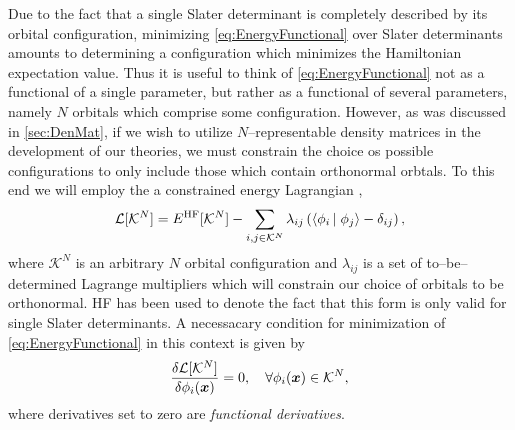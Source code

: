 Due to the fact that a single Slater determinant is completely described by its orbital configuration,
minimizing \cref{eq:EnergyFunctional} over Slater determinants amounts to determining a configuration
which minimizes the Hamiltonian expectation value. Thus it is useful to think of \cref{eq:EnergyFunctional}
not as a functional of a single parameter, but rather as a functional of several parameters, namely $N$
orbitals which comprise some configuration. However, as was discussed in \cref{sec:DenMat}, if we wish
to utilize $N$--representable density matrices in the development of our theories, we must constrain
the choice os possible configurations to only include those which contain orthonormal orbtals. To this
end we will employ the a constrained energy Lagrangian \cite{Ostlund12_book},
\begin{equation}
\mathcal{L}[\mathcal{K}^N] = E^\mathrm{HF}[\mathcal{K}^N] - \sum_{i,j \in \mathcal{K}^N} \lambda_{ij} \left( \left\langle \phi_i \left\vert\right. \phi_j \right\rangle - \delta_{ij} \right),
\end{equation}
where $\mathcal{K}^N$ is an arbitrary $N$ orbital configuration and $\lambda_{ij}$ is a set of to--be--determined Lagrange multipliers
which will constrain our choice of orbitals to be orthonormal. HF has been used to denote the fact that this form is only valid
for single Slater determinants.
A necessacary condition for minimization of \cref{eq:EnergyFunctional} in this context is given by
\begin{equation}
\label{eq:ConstrMin}
\frac{\delta \mathcal{L}[\mathcal{K}^N]}{\delta \phi_i (\boldsymbol{x})} = 0 ,\quad \forall \phi_i(\boldsymbol{x}) \in \mathcal{K}^N,
\end{equation}
where derivatives set to zero are \emph{functional derivatives}. 

